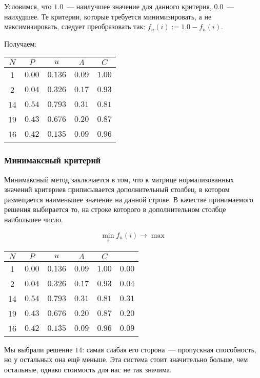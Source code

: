 \documentclass[12pt, a4paper] {ncc}
\begin{document}
Условимся, что $1.0$~--- наилучшее значение для данного критерия, $0.0$~---
наихудшее. Те критерии, которые требуется минимизировать, а не максимизировать,
следует преобразовать так: $f_n(i) := 1.0 - f_n(i)$.

Получаем:

\begin{tabular}{|c||c|c|c|c|}
\hline
$N$ & $P$    & $u$     & $\Lambda$ & $C$ \\ \hline
\hline
1   & $0.00$ & $0.136$ & $0.09$    & $1.00$ \\ \hline
2   & $0.04$ & $0.326$ & $0.17$    & $0.93$ \\ \hline
14  & $0.54$ & $0.793$ & $0.31$    & $0.81$ \\ \hline
19  & $0.43$ & $0.676$ & $0.20$    & $0.87$ \\ \hline
16  & $0.42$ & $0.135$ & $0.09$    & $0.96$ \\ \hline
\end{tabular}

\subsubsection{Минимаксный критерий}

Минимаксный метод заключается в том, что к матрице нормализованных значений
критериев приписывается дополнительный столбец, в котором размещается наименьшее
значение на данной строке. В качестве принимаемого решения выбирается то, на
строке которого в дополнительном столбце наибольшее число.

$$\min_i f_n(i) \rightarrow \max$$

\begin{tabular}{|c||c|c|c|c||c|}
\hline
$N$ & $P$    & $u$     & $\Lambda$ & $C$    &        \\ \hline
\hline
1   & $0.00$ & $0.136$ & $0.09$    & $1.00$ & $0.00$ \\ \hline
2   & $0.04$ & $0.326$ & $0.17$    & $0.93$ & $0.04$ \\ \hline
14  & $0.54$ & $0.793$ & $0.31$    & $0.81$ & $0.31$ \\ \hline
19  & $0.43$ & $0.676$ & $0.20$    & $0.87$ & $0.20$ \\ \hline
16  & $0.42$ & $0.135$ & $0.09$    & $0.96$ & $0.09$ \\ \hline
\end{tabular}

Мы выбрали решение $14$: самая слабая его сторона~--- пропускная способность, но
у остальных она ещё меньше. Эта система стоит значительно больше, чем остальные,
однако стоимость для нас не так значима.
\end{document}
